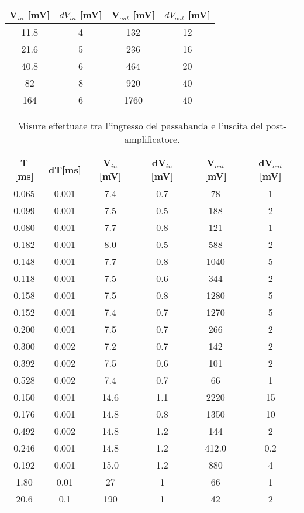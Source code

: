 \begin{table}[h]
	\centering
	\begin{tabular}{cccc}		
		 {V$_{in}$ [mV]} & {$dV_{in}$ [mV]} & {V$_{out}$ [mV]} & {$dV_{out}$ [mV]} \\
		 \midrule
                       11.8 & 4 & 132 & 12 \\
                       21.6 & 5 & 236 & 16 \\
                       40.8 & 6 & 464 & 20 \\
                       82 & 8 & 920 &40 \\
                       164 & 6 & 1760 & 40 \\
 	\end{tabular}
	\caption{}
	\label{t:risposta_ampiezza}
\end{table}


\begin{table}[h]
	\centering
	\begin{tabular}{cccccc}		
		{T [ms]} & {dT[ms]} & {V$_{in}$ [mV]} & {dV$_{in}$ [mV]} & {V$_{out}$ [mV]} & {dV$_{out}$ [mV]} \\
		 \midrule
	0.065 & 0.001& 7.4 & 0.7 &78 & 1 \\ 	
	0.099 & 0.001& 7.5 & 0.5 &188 & 2 \\ 
	0.080 & 0.001& 7.7 & 0.8 &121 & 1 \\ 
	0.182 & 0.001& 8.0 & 0.5 &588 & 2 \\ 
	0.148 & 0.001& 7.7 & 0.8 &1040 & 5 \\ 
	0.118 & 0.001 &7.5 & 0.6 &344 & 2 \\ 
	0.158 & 0.001 &7.5 & 0.8& 1280 & 5 \\ 
	0.152 & 0.001 &7.4 & 0.7 &1270 & 5 \\ 
	0.200 & 0.001 &7.5 & 0.7 &266 & 2 \\ 
	0.300 & 0.002 &7.2 & 0.7 &142 & 2 \\ 
	0.392 & 0.002 &7.5 & 0.6 &101 & 2 \\ 
	0.528 & 0.002 &7.4 & 0.7 &66 & 1 \\ 
	0.150 & 0.001 &14.6 & 1.1 &2220 & 15 \\ 
	0.176 & 0.001 &14.8 & 0.8 &1350 & 10 \\ 
	0.492 & 0.002 &14.8 & 1.2 &144 & 2 \\ 
	0.246 & 0.001 &14.8 & 1.2 &412.0 & 0.2 \\ 
	0.192 & 0.001 &15.0 & 1.2 &880 & 4 \\ 
	1.80 & 0.01 &27 & 1& 66 & 1 \\ 
	20.6 & 0.1 &190 & 1& 42 & 2 \\ 
 	\end{tabular}
	\caption{Misure effettuate tra l'ingresso del passabanda e l'uscita del post-amplificatore. }
	\label{t:passabanda}
\end{table}